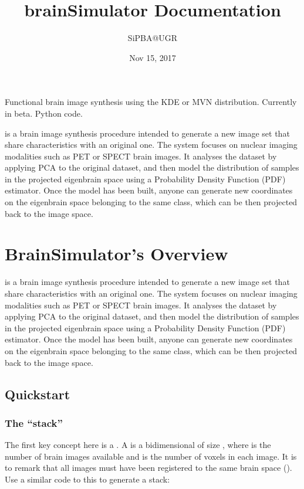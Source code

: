 \documentclass[letterpaper,10pt,english]{sphinxmanual}
\title{brainSimulator Documentation}
\date{Nov 15, 2017}
\author{SiPBA@UGR}
\begin{document}
\maketitle
\sphinxtableofcontents
{}\label{\detokenize{index::doc}}


Functional brain image synthesis using the KDE or MVN distribution. Currently in beta. Python code.

 is a brain image synthesis procedure intended to generate a new image set that share characteristics with an original one. The system focuses on nuclear imaging modalities such as PET or SPECT brain images. It analyses the dataset by applying PCA to the original dataset, and then model the distribution of samples in the projected eigenbrain space using a Probability Density Function (PDF) estimator. Once the model has been built, anyone can generate new coordinates on the eigenbrain space belonging to the same class, which can be then projected back to the image space.


\chapter{BrainSimulator’s Overview}
\label{\detokenize{overview:brainsimulator-s-overview}}\label{\detokenize{overview:welcome-to-brainsimulator-s-documentation}}\label{\detokenize{overview::doc}}
 is a brain image synthesis procedure intended to generate a new image set that share characteristics with an original one. The system focuses on nuclear imaging modalities such as PET or SPECT brain images. It analyses the dataset by applying PCA to the original dataset, and then model the distribution of samples in the projected eigenbrain space using a Probability Density Function (PDF) estimator. Once the model has been built, anyone can generate new coordinates on the eigenbrain space belonging to the same class, which can be then projected back to the image space.

\begin{figure}[htbp]
\centering

\noindent{}
\end{figure}


\section{Quickstart}
\label{\detokenize{overview:quickstart}}

\subsection{The “stack”}
\label{\detokenize{overview:the-stack}}
The first key concept here is a . A  is a bidimensional  of size , where  is the number of brain images available and  is the number of voxels in each image. It is  to remark that all images must have been registered to the same brain space (). Use a similar code to this to generate a stack:
\end{document}
